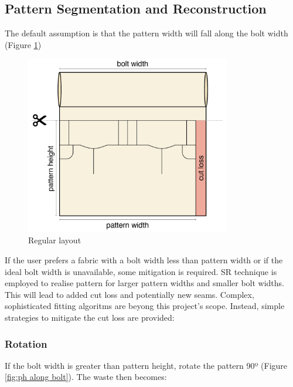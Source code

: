 
\subsection{Pattern Segmentation and Reconstruction}
The default assumption is that the pattern width will fall along the bolt width (Figure \ref{fig:pw along bolt})
\begin{figure} [htb]
    \centering 
    \includegraphics[width = 0.8\textwidth]{Images/regular layout.png}
    \caption{Regular layout}
    \label{fig:pw along bolt}
\end{figure}

If the user prefers a fabric with a bolt width less than pattern width or if the ideal bolt width is unavailable, some mitigation is required. SR technique is employed to realise pattern for larger pattern widths and smaller bolt widths. This will lead to added cut loss and potentially new seams. Complex, sophisticated fitting algoritms are beyong this project's scope. Instead, simple strategies to mitigate the cut loss are provided:

\subsubsection{Rotation}
If the bolt width is greater than pattern height, rotate the pattern 90º (Figure \ref{fig:ph along bolt}).
The waste then becomes:


